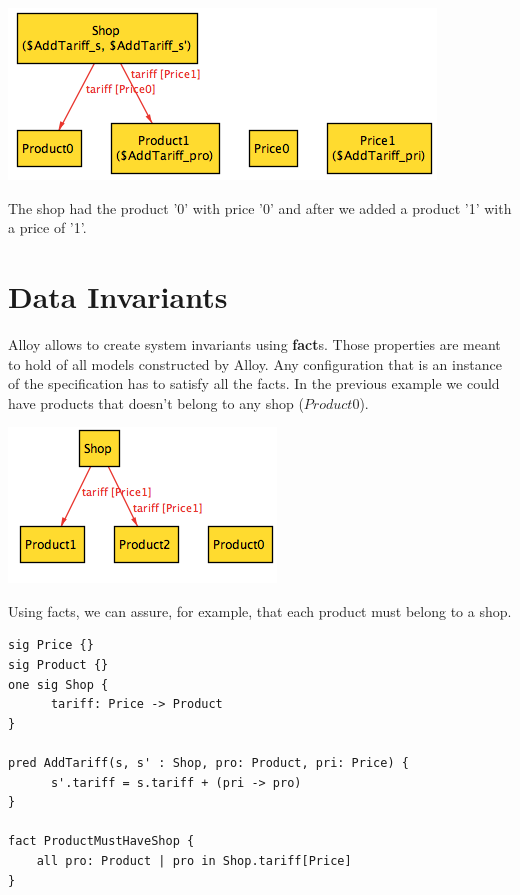 \documentclass[oneside]{book}
\begin{document}
\begin{center}
\includegraphics[scale=0.6]{shop3}
\end{center}

The shop had the product '0' with price '0' and after we added a product '1' with a price of '1'.

\section{Data Invariants}

Alloy allows to create system invariants using \textbf{fact}s. Those properties are meant to hold of all models constructed by Alloy. Any configuration that is an instance of the specification has to satisfy all the facts. In the previous example we could have products that doesn't belong to any shop ($Product0$).

\begin{center}
\includegraphics[scale=0.6]{shop4}
\end{center}

Using facts, we can assure, for example, that each product must belong to a shop.

\begin{lstlisting}
sig Price {}
sig Product {}
one sig Shop {
	  tariff: Price -> Product
}

pred AddTariff(s, s' : Shop, pro: Product, pri: Price) {
	  s'.tariff = s.tariff + (pri -> pro)
}

fact ProductMustHaveShop {
	all pro: Product | pro in Shop.tariff[Price]
}
\end{lstlisting}
\end{document}
